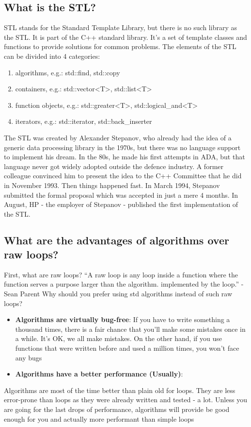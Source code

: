 \documentclass{report}
\begin{document}
\pagebreak 
{}
\bigbreak \noindent 
\subsection{What is the STL?}
\bigbreak \noindent 
STL stands for the Standard Template Library, but there is no such
library as the STL. It is part of the C++ standard library.
\bigbreak \noindent 
It’s a set of template classes and functions to provide solutions for
common problems. The elements of the STL can be divided into 4
categories:
\begin{enumerate}
    \item algorithms, e.g.: std::find, std::copy
    \item containers, e.g.: std::vector<T>, std::list<T>
    \item function objects, e.g.: std::greater<T>, std::logical_and<T>
    \item iterators, e.g.: std::iterator, std::back_inserter
\end{enumerate}
\bigbreak \noindent 
The STL was created by Alexander Stepanov, who already had the
idea of a generic data processing library in the 1970s, but there was
no language support to implement his dream.
\bigbreak \noindent 
In the 80s, he made his first attempts in ADA, but that language
never got widely adopted outside the defence industry.
\bigbreak \noindent 
A former colleague convinced him to present the idea to the C++
Committee that he did in November 1993. Then things happened
fast. In March 1994, Stepanov submitted the formal proposal which
was accepted in just a mere 4 months. In August, HP - the employer
of Stepanov - published the first implementation of the STL.

\bigbreak \noindent 
\subsection{What are the advantages of algorithms over raw loops?}
\bigbreak \noindent 
First, what are raw loops?
\bigbreak \noindent 
“A raw loop is any loop inside a function where the function serves
a purpose larger than the algorithm. implemented by the loop.” -
Sean Parent
\bigbreak \noindent 
Why should you prefer using std algorithms
instead of such raw loops?
\begin{itemize}
    \item \textbf{Algorithms are virtually bug-free}: If you have to write something a thousand times, there is a fair chance that you’ll make some mistakes once in a while. It’s OK, we all make mistakes. On the other hand, if you use functions that were written before and used a million times, you won’t face any bugs
    \item \textbf{Algorithms have a better performance (Usually)}:
\end{itemize}
\bigbreak \noindent 
Algorithms are most of the time better than plain old for loops.
\bigbreak \noindent 
They are less error-prone than loops as they were already written
and tested - a lot. Unless you are going for the last drops of
performance, algorithms will provide be good enough for you and
actually more performant than simple loops
\end{document}
